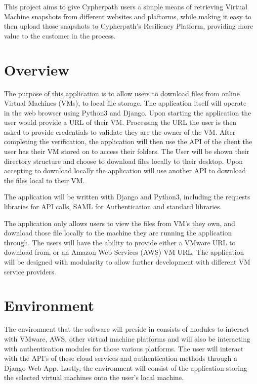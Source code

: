 \documentclass{article}
\begin{document}
	This project aims to give Cypherpath users a simple means of retrieving Virtual Machine snapshots from different websites and plaftorms, while making it easy to 
	then upload those snapshots to Cypherpath's Resiliency Platform, providing more value to the customer in the process.


    \section{Overview}
    The purpose of this application is to allow users to download files from online Virtual Machines (VMs), to local file storage.
    The application itself will operate in the web browser using Python3 and Django. Upon starting the application the user would
    provide a URL of their VM. Processing the URL the user is then asked to provide credentials to validate they are the owner of
    the VM. After completing the verification, the application will then use the API of the client the user has their VM stored on
    to access their folders. The User will be shown their directory structure and choose to download files locally to their desktop.
    Upon accepting to download locally the application will use another API to download the files local to their VM.

    The application will be written with Django and Python3, including the requests libraries for API calls, SAML for Authentication
    and standard libraries.

    The application only allows users to view the files from VM's they own, and download those file locally to the machine they 
    are running the application through. The users will have the ability to provide either a VMware URL to download from, or an
    Amazon Web Services (AWS) VM URL. The application will be designed with modularity to allow further 
    development with different VM service providers.  


    \section{Environment}

    The environment that the software will preside in consists of modules to interact with VMware, 
    AWS, other virtual machine platforms and will also be interacting with authentication modules for those
    various platforms. The user will interact with the API's of these cloud services and authentication
    methods through a Django Web App. Lastly, the environment will consist of the application storing the selected
    virtual machines onto the user's local machine.
\end{document}
